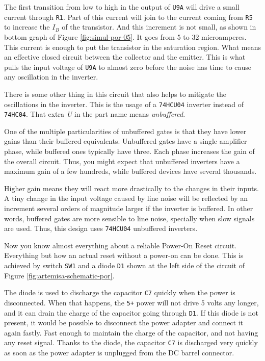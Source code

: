 The first transition from low to high in the output of {\tt U9A} will drive a small current through {\tt R1}. Part of this current will join to the current coming from {\tt R5} to increase the $I_B$ of the transistor. And this increment is not small, as shown in bottom graph of Figure \ref{fig:simul-por-05}. It goes from 5 to 32 microamperes. This current is enough to put the transistor in the saturation region. What means an effective closed circuit between the collector and the emitter. This is what pulls the input voltage of {\tt U9A} to almost zero before the noise has time to cause any oscillation in the inverter.

There is some other thing in this circuit that also helps to mitigate the oscillations in the inverter. This is the usage of a {\tt 74HCU04} inverter instead of {\tt 74HC04}. That extra {\it U} in the part name means {\it unbuffered}.

One of the multiple particularities of unbuffered gates is that they have lower gains than their buffered equivalents. Unbuffered gates have a single amplifier phase, while buffered ones typically have three. Each phase increases the gain of the overall circuit. Thus, you might expect that unbuffered inverters have a maximum gain of a few hundreds, while buffered devices have several thousands.

Higher gain means they will react more drastically to the changes in their inputs. A tiny change in the input voltage caused by line noise will be reflected by an increment several orders of magnitude larger if the inverter is buffered. In other words, buffered gates are more sensible to line noise, specially when slow signals are used. Thus, this design uses {\tt 74HCU04} unbuffered inverters.

Now you know almost everything about a reliable Power-On Reset circuit. Everything but how an actual reset without a power-on can be done. This is achieved by switch {\tt SW1} and a diode {\tt D1} shown at the left side of the circuit of Figure \ref{fig:artemisa-schematic-por}.

The diode is used to discharge the capacitor {\tt C7} quickly when the power is disconnected. When that happens, the {\tt 5+} power will not drive 5 volts any longer, and it can drain the charge of the capacitor going through {\tt D1}. If this diode is not present, it would be possible to disconnect the power adapter and connect it again fastly. Fast enough to maintain the charge of the capacitor, and not having any reset signal. Thanks to the diode, the capacitor {\tt C7} is discharged very quickly as soon as the power adapter is unplugged from the DC barrel connector.

